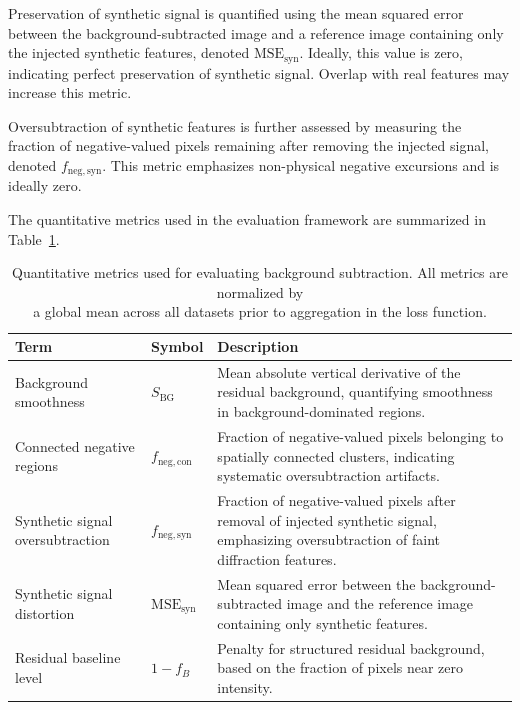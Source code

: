 \documentclass[11pt,onecolumn]{IEEEtran}
\begin{document}
Preservation of synthetic signal is quantified using the mean squared error between the background-subtracted image and a reference image containing only the injected synthetic features, denoted $\mathrm{MSE}_{\mathrm{syn}}$. Ideally, this value is zero, indicating perfect preservation of synthetic signal. 
Overlap with real features may increase this metric.

Oversubtraction of synthetic features is further assessed by measuring the fraction of negative-valued pixels remaining after removing the injected signal, denoted $f_{\mathrm{neg,syn}}$. This metric emphasizes non-physical negative excursions and is ideally zero.

The quantitative metrics used in the evaluation framework are summarized in Table~\ref{tab:loss_terms}.


\begin{table}[t]
\caption{Quantitative metrics used for evaluating background subtraction. 
All metrics are normalized by\\\hspace{0.1\textwidth}a global mean across all datasets prior to aggregation in the loss function.}
\label{tab:loss_terms}
\centering
\small
\setlength{\tabcolsep}{6pt}
\renewcommand{\arraystretch}{1.1}
\begin{tabular}{@{}llp{7cm}@{}}
\toprule
\textbf{Term} & \textbf{Symbol} & \textbf{Description} \\
\midrule
Background smoothness & $S_{\mathrm{BG}}$ & Mean absolute vertical derivative of the residual background, quantifying smoothness in background-dominated regions. \\
Connected negative regions & $f_{\mathrm{neg,con}}$ & Fraction of negative-valued pixels belonging to spatially connected clusters, indicating systematic oversubtraction artifacts. \\
Synthetic signal oversubtraction & $f_{\mathrm{neg,syn}}$ & Fraction of negative-valued pixels after removal of injected synthetic signal, emphasizing oversubtraction of faint diffraction features. \\
Synthetic signal distortion & $\mathrm{MSE}_{\mathrm{syn}}$ & Mean squared error between the background-subtracted image and the reference image containing only synthetic features. \\
Residual baseline level & $1 - f_{B}$ & Penalty for structured residual background, based on the fraction of pixels near zero intensity. \\
\bottomrule
\end{tabular}
\end{table}
\end{document}
